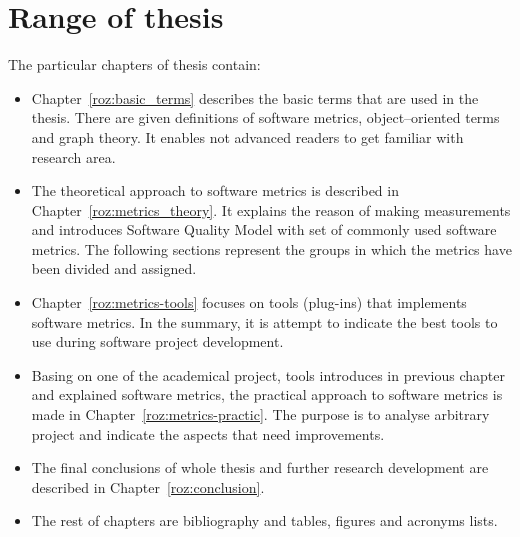 \section{Range of thesis}
The particular chapters of thesis contain:

\begin{itemize}
\item Chapter~\ref{roz:basic_terms} describes the basic terms that are used in the thesis. There are given definitions of software metrics, object--oriented terms and graph theory. It enables not advanced readers to get familiar with research area. 
\item The theoretical approach to software metrics is described in Chapter~\ref{roz:metrics_theory}. It explains the reason of making measurements and introduces Software Quality Model with set of commonly used software metrics. The following sections represent the groups in which the metrics have been divided and assigned. 
\item Chapter~\ref{roz:metrics-tools} focuses on tools (plug-ins) that implements software metrics. In the summary, it is attempt to indicate the best tools to use during software project development. 
\item Basing on one of the academical project, tools introduces in previous chapter and explained software metrics, the practical approach to software metrics is made in Chapter~\ref{roz:metrics-practic}. The purpose is to analyse arbitrary project and indicate the aspects that need improvements. 
\item The final conclusions of whole thesis and further research development are described in Chapter~\ref{roz:conclusion}.  
\item The rest of chapters are bibliography and tables, figures and acronyms lists.
\end{itemize}